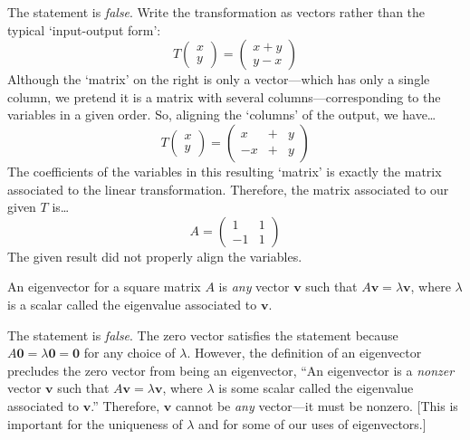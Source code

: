 \documentclass[11pt,letterpaper]{article}
\begin{document}
\sol The statement is \textit{false}. Write the transformation as vectors rather than the typical `input-output form':
	\[
	T \begin{pmatrix} x \\ y \end{pmatrix}= \begin{pmatrix} x + y \\ y - x \end{pmatrix}
	\]
Although the `matrix' on the right is only a vector---which has only a single column, we pretend it is a matrix with several columns---corresponding to the variables in a given order. So, aligning the `columns' of the output, we have\dots
	\[
	T \begin{pmatrix} x \\ y \end{pmatrix}= \left( \begin{array}{ccc} x & + & y \\ -x & + & y \end{array} \right)
	\]
The coefficients of the variables in this resulting `matrix' is exactly the matrix associated to the linear transformation. Therefore, the matrix associated to our given $T$ is\dots
	\[
	A= \begin{pmatrix} 1 & 1 \\ -1 & 1 \end{pmatrix}
	\]
The given result did not properly align the variables. \pvspace{1.3cm}



\newpage



 An eigenvector for a square matrix $A$ is \textit{any} vector $\mathbf{v}$ such that $A\mathbf{v}= \lambda \mathbf{v}$, where $\lambda$ is a scalar called the eigenvalue associated to $\mathbf{v}$. \pspace

\sol The statement is \textit{false}. The zero vector satisfies the statement because $A\mathbf{0}= \lambda \mathbf{0}= \mathbf{0}$ for any choice of $\lambda$. However, the definition of an eigenvector precludes the zero vector from being an eigenvector, ``An eigenvector is a \textit{nonzer} vector $\mathbf{v}$ such that $A\mathbf{v}= \lambda \mathbf{v}$, where $\lambda$ is some scalar called the eigenvalue associated to $\mathbf{v}$.''  Therefore, $\mathbf{v}$ cannot be \textit{any} vector---it must be nonzero. [This is important for the uniqueness of $\lambda$ and for some of our uses of eigenvectors.] \pvspace{1.3cm}
\end{document}
